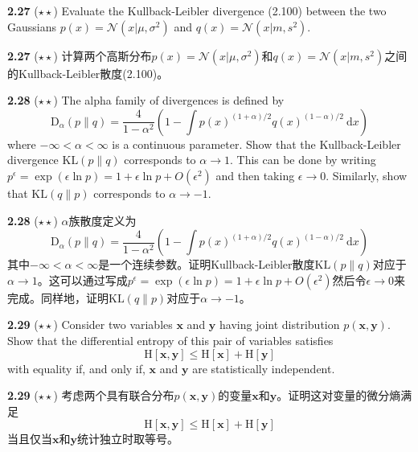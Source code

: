 \documentclass{article}
\begin{document}
\textbf{2.27} ($\star\star$) Evaluate the Kullback-Leibler divergence (2.100) between the two Gaussians $p(x)=\mathcal{N}\left(x | \mu, \sigma^{2}\right)$ and $q(x)=\mathcal{N}\left(x | m, s^{2}\right)$.

\textbf{2.27} ($\star\star$) 计算两个高斯分布$p(x)=\mathcal{N}\left(x | \mu, \sigma^{2}\right)$和$q(x)=\mathcal{N}\left(x | m, s^{2}\right)$之间的Kullback-Leibler散度(2.100)。

\textbf{2.28} ($\star\star$) The alpha family of divergences is defined by
\begin{equation}
\mathrm{D}_{\alpha}(p \| q)=\frac{4}{1-\alpha^{2}}\left(1-\int p(x)^{(1+\alpha) / 2} q(x)^{(1-\alpha) / 2} \mathrm{~d} x\right)
\tag{2.129}
\end{equation}
where $-\infty<\alpha<\infty$ is a continuous parameter. Show that the Kullback-Leibler divergence $\mathrm{KL}(p \| q)$ corresponds to $\alpha \rightarrow 1$. This can be done by writing $p^{\epsilon}=\exp (\epsilon \ln p)=1+\epsilon \ln p+O\left(\epsilon^{2}\right)$ and then taking $\epsilon \rightarrow 0$. Similarly, show that $\mathrm{KL}(q \| p)$ corresponds to $\alpha \rightarrow-1$.

\textbf{2.28} ($\star\star$) $\alpha$族散度定义为
\begin{equation}
\mathrm{D}_{\alpha}(p \| q)=\frac{4}{1-\alpha^{2}}\left(1-\int p(x)^{(1+\alpha) / 2} q(x)^{(1-\alpha) / 2} \mathrm{~d} x\right)
\tag{2.129}
\end{equation}
其中$-\infty<\alpha<\infty$是一个连续参数。证明Kullback-Leibler散度$\mathrm{KL}(p \| q)$对应于$\alpha \rightarrow 1$。这可以通过写成$p^{\epsilon}=\exp (\epsilon \ln p)=1+\epsilon \ln p+O\left(\epsilon^{2}\right)$然后令$\epsilon \rightarrow 0$来完成。同样地，证明$\mathrm{KL}(q \| p)$对应于$\alpha \rightarrow-1$。

\textbf{2.29} ($\star\star$) Consider two variables $\mathbf{x}$ and $\mathbf{y}$ having joint distribution $p(\mathbf{x}, \mathbf{y})$. Show that the differential entropy of this pair of variables satisfies
\begin{equation}
\mathrm{H}[\mathbf{x}, \mathbf{y}] \leqslant \mathrm{H}[\mathbf{x}]+\mathrm{H}[\mathbf{y}]
\tag{2.130}
\end{equation}
with equality if, and only if, $\mathbf{x}$ and $\mathbf{y}$ are statistically independent.

\textbf{2.29} ($\star\star$) 考虑两个具有联合分布$p(\mathbf{x}, \mathbf{y})$的变量$\mathbf{x}$和$\mathbf{y}$。证明这对变量的微分熵满足
\begin{equation}
\mathrm{H}[\mathbf{x}, \mathbf{y}] \leqslant \mathrm{H}[\mathbf{x}]+\mathrm{H}[\mathbf{y}]
\tag{2.130}
\end{equation}
当且仅当$\mathbf{x}$和$\mathbf{y}$统计独立时取等号。
\end{document}
